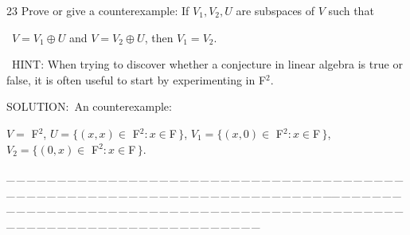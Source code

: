 \documentclass[a4paper, 11pt, UTF8]{article}
\begin{document}
\begin{large}
{\timesbf\Large 23} {\timessl\Large 
Prove or give a counterexample: If $V_1,V_2,U$ are subspaces of $V$ such that}\par\quad\,
{\timessl\Large $V=V_1\oplus U$ and $V=V_2\oplus U$, then $V_1=V_2$.}\par\quad\,
{\timesbf H{\small INT:}} {\timessl\footnotesize
When trying to discover whether a conjecture in linear algebra is true or false, it is often useful to start by experimenting in {\timesbf F}$^2$.
}\par
{\timesbf S\footnotesize{OLUTION:}}\,\,\,An counterexample:\par\quad
$V=$ {\timesbf F}$^2$,  $U=\{(x,x)\in$ {\timesbf F}$^2:x\in${\timesbf F}$\,\}$, $V_1=\{(x,0)\in$ {\timesbf F}$^2:x\in${\timesbf F}$\,\}$, $V_2=\{(0,x)\in$ {\timesbf F}$^2:x\in${\timesbf F}$\,\}$.\par
{\tiny \_\,\_\,\_\,\_\,\_\,\_\,\_\,\_\,\_\,\_\,\_\,\_\,\_\,\_\,\_\,\_\,\_\,\_\,\_\,\_\,\_\,\_\,\_\,\_\,\_\,\_\,\_\,\_\,\_\,\_\,\_\,\_\,\_\,\_\,\_\,\_\,\_\,\_\,\_\,\_\,\_\,\_\,\_\,\_\,\_\,\_\,\_\,\_\,\_\,\_\,\_\,\_\,\_\,\_\,\_\,\_\,\_\,\_\,\_\,\_\,\_\,\_\,\_\,\_\,\_\,\_\,\_\,\_\,\_\,\_\,\_\_\,\_\,\_\,\_\,\_\,\_\,\_\,\_\,\_\,\_\,\_\,\_\,\_\,\_\,\_\,\_\,\_\,\_\,\_\,\_\,\_\,\_\,\_\,\_\,\_\,\_\,\_\,\_\,\_\,\_\,\_\,\_\,\_\,\_\,\_\,\_\,\_\,\_\,\_\,\_\,\_\,\_\,\_\,\_\,\_\,\_\,\_\,\_\,\_\,\_\,\_\,\_\,\_\,\_\,\_\,\_\,\_\,\_\,\_\,\_\,\_\,\_\,\_\,\_\,\_\,\_\,\_\,\_\,\_\,\_\,\_}\par


\end{large}
\end{document}

